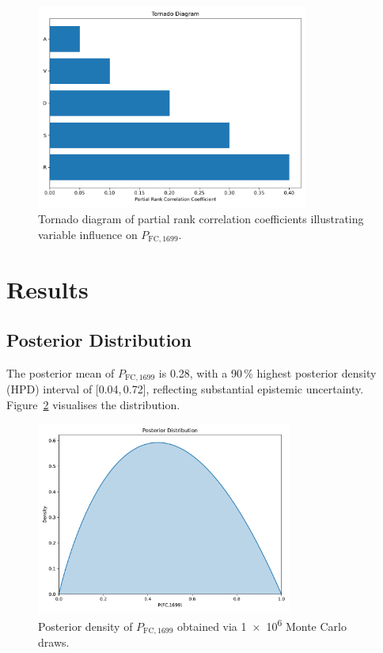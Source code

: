 \documentclass[11pt]{article}
\begin{document}
\begin{figure}[ht]
  \centering
  \includegraphics[width=0.8\textwidth]{tornado.pdf}
  \caption{Tornado diagram of partial rank correlation coefficients illustrating variable influence on $P_{\mathrm{FC},1699}$.}
  \label{fig:tornado}
\end{figure}

\section{Results}
\subsection{Posterior Distribution}
The posterior mean of $P_{\mathrm{FC},1699}$ is \SI{0.28}{}, with a 90\,\% highest posterior density (HPD) interval of [\SI{0.04}{},\,\SI{0.72}{}], reflecting substantial epistemic uncertainty. Figure~\ref{fig:posterior} visualises the distribution.

\begin{figure}[ht]
  \centering
  \includegraphics[width=0.75\textwidth]{posterior.pdf}
  \caption{Posterior density of $P_{\mathrm{FC},1699}$ obtained via \num{1e6} Monte Carlo draws.}
  \label{fig:posterior}
\end{figure}
\end{document}
